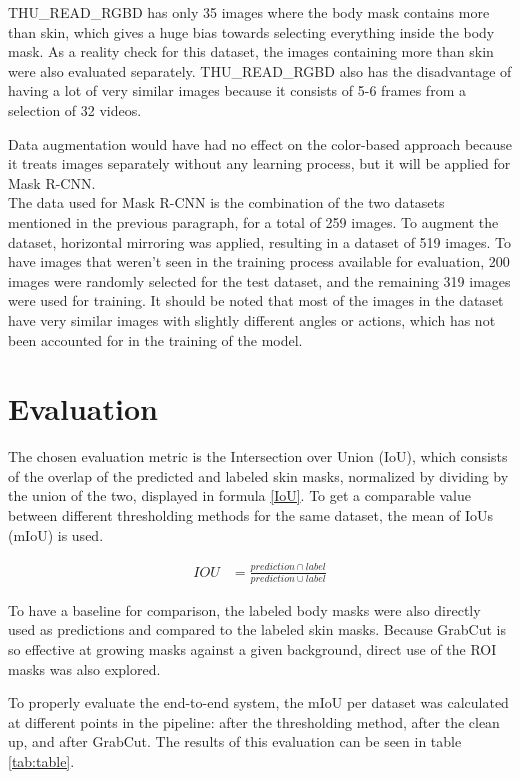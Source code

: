 \documentclass[conference]{IEEEtran}
\begin{document}
THU\_READ\_RGBD has only 35 images where the body mask contains more than skin, which gives a huge bias towards selecting everything inside the body mask. As a reality check for this dataset, the images containing more than skin were also evaluated separately. THU\_READ\_RGBD also has the disadvantage of having a lot of very similar images because it consists of 5-6 frames from a selection of 32 videos.

Data augmentation would have had no effect on the color-based approach because it treats images separately without any learning process, but it will be applied for Mask R-CNN. \\

The data used for Mask R-CNN is the combination of the two datasets mentioned in the previous paragraph, for a total of 259 images. To augment the dataset, horizontal mirroring was applied, resulting in a dataset of 519 images. To have images that weren't seen in the training process available for evaluation, 200 images were randomly selected for the test dataset, and the remaining 319 images were used for training. It should be noted that most of the images in the dataset have very similar images with slightly different angles or actions, which has not been accounted for in the training of the model.

\section{Evaluation}

The chosen evaluation metric is the Intersection over Union (IoU), which consists of the overlap of the predicted and labeled skin masks, normalized by dividing by the union of the two, displayed in formula \ref{IoU}. To get a comparable value between different thresholding methods for the same dataset, the mean of IoUs (mIoU) is used.

\begin{align}
IOU &= \frac{prediction \cap label}{prediction \cup label}
\label{IoU}
\end{align}

To have a baseline for comparison, the labeled body masks were also directly used as predictions and compared to the labeled skin masks. Because GrabCut is so effective at growing masks against a given background, direct use of the ROI masks was also explored.

To properly evaluate the end-to-end system, the mIoU per dataset was calculated at different points in the pipeline: after the thresholding method, after the clean up, and after GrabCut. The results of this evaluation can be seen in table \ref{tab:table}.
\end{document}
